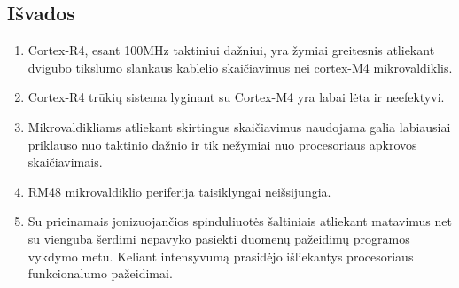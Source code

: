 \documentclass[a4paper, 12pt]{article} %
\begin{document}
\begin{onehalfspacing}
\section{I\v{s}vados}


\begin{enumerate}
\item Cortex-R4, esant 100MHz taktiniui da\v{z}niui, yra \v{z}ymiai greitesnis atliekant dvigubo tikslumo slankaus kablelio skai\v{c}iavimus nei cortex-M4 mikrovaldiklis.
\item Cortex-R4 tr\=uki\k{u} sistema lyginant su Cortex-M4 yra labai l\.{e}ta ir neefektyvi.
\item Mikrovaldikliams atliekant skirtingus skai\v{c}iavimus naudojama galia labiausiai priklauso nuo taktinio da\v{z}nio ir tik ne\v{z}ymiai nuo procesoriaus apkrovos skai\v{c}iavimais.
\item RM48 mikrovaldiklio periferija taisiklyngai nei\v{s}sijungia.
\item Su prieinamais jonizuojan\v{c}ios spinduliuot\.{e}s \v{s}altiniais atliekant matavimus net su vienguba \v{s}erdimi nepavyko pasiekti duomen\k{u} pa\v{z}eidim\k{u} programos vykdymo metu. Keliant intensyvum\k{a} prasid\.{e}jo i\v{s}liekantys procesoriaus funkcionalumo pa\v{z}eidimai.
\end{enumerate}


\newpage





\end{onehalfspacing}
\end{document}
